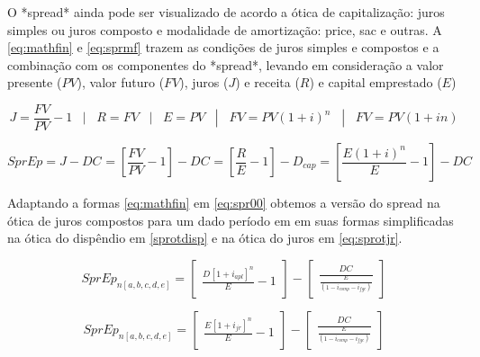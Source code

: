 \documentclass[
  12pt,
  12pt,
  openright,
  oneside,
  a4paper,
  chapter=TITLE,
  section=TITLE,
  subsection=TITLE,
  subsubsection=TITLE,
  english,
  portugues,
  sumario=tradicional]{abntex2}
\begin{document}
\begin{apendicesenv}
O *spread* ainda pode ser visualizado de acordo a ótica de capitalização: juros simples ou juros composto e modalidade de amortização: price, sac e outras. A \autoref{eq:mathfin} e \autoref{eq:sprmf} trazem as condições de juros simples e compostos e a combinação com os componentes do *spread*, levando em consideração a valor presente ($PV$), valor futuro ($FV$), juros ($J$) e receita ($R$) e capital emprestado ($E$) 


\begin{equation}\label{eq:mathfin}
J = \frac{FV}{PV} - 1  \hspace{10pt} | \hspace{10pt} R = FV \hspace{10pt} | \hspace{10pt} E = PV \hspace{10pt} | \hspace{10pt}  FV = PV(1 + i)^n  \hspace{10pt} |   \hspace{10pt} FV = PV(1 + i n)
\end{equation}



\begin{equation}\label{eq:sprmf}
SprEp = J - DC_{} = [\frac{FV}{PV} - 1] - DC_{} = [\frac{R}{E} - 1] - D_{cap} = [\frac{E(1 + i)^n}{E} - 1] - DC_{}
\end{equation}


Adaptando a formas \autoref{eq:mathfin} em \autoref{eq:spr00} obtemos a versão do spread na ótica de juros compostos para um dado período em em suas formas simplificadas na ótica do dispêndio em \autoref{sprotdisp}  e na ótica do juros em \autoref{eq:sprotjr}. 



\begin{equation}\label{sprotdisp}
SprEp_{n[a,b,c,d,e]} = \left[ \begin{array}{c} \frac{D_{}[1 + i_{apl}]^n  }{E_{}} -1 \end{array} \right] - \left[ \begin{array}{c} \frac{DC_{}}{\frac{E_{}}{(1 - i_{comp} - i_{fgc})}} \end{array} \right]
\end{equation}



\begin{equation}\label{eq:sprotjr}
SprEp_{n[a,b,c,d,e]} = \left[ \begin{array}{c} \frac{E_{}[1 + i_{jr}]^n }{E_{}} -1 \end{array} \right] - \left[ \begin{array}{c} \frac{DC_{}}{\frac{E_{}}{(1 - i_{comp} - i_{fgc})}} \end{array} \right]
\end{equation}



\end{apendicesenv}
\end{document}
